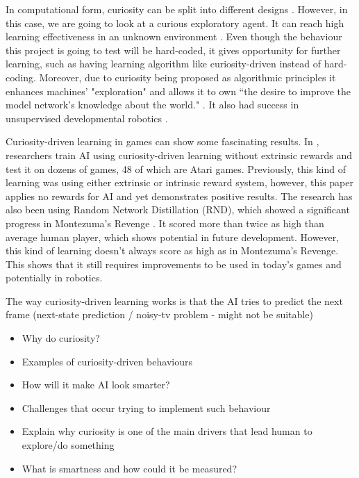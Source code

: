 \documentclass[journal]{IEEEtran}
\begin{document}
In computational form, curiosity can be split into different designs \cite{wu2013curiosity}. However, in this case, we are going to look at a curious exploratory agent. It can reach high learning effectiveness in an unknown environment \cite{wu2013curiosity}\cite{macedo2005role}. Even though the behaviour this project is going to test will be hard-coded, it gives opportunity for further learning, such as having learning algorithm like curiosity-driven instead of hard-coding. Moreover, due to curiosity being proposed as algorithmic principles \cite{wu2013curiosity}\cite{pang2009curiosity}\cite{karaoguz2011curiosity} it enhances machines' "exploration" and allows it to own ``the desire to improve the model network's knowledge about the world." \cite{schmidhuber1991possibility}. It also had success in unsupervised developmental robotics \cite{schmidhuber2006developmental}\cite{oudeyer2004intelligent}.

Curiosity-driven learning in games can show some fascinating results. In \cite{burda2018large}, researchers train AI using curiosity-driven learning without extrinsic rewards and test it on dozens of games, 48 of which are Atari games. Previously, this kind of learning was using either extrinsic or intrinsic reward system, however, this paper applies no rewards for AI and yet demonstrates positive results. The research has also been using Random Network Distillation (RND), which showed a significant progress in Montezuma's Revenge \cite{openairl}\cite{montezumarevenge}. It scored more than twice as high than average human player, which shows potential in future development. However, this kind of learning doesn't always score as high as in Montezuma's Revenge. This shows that it still requires improvements to be used in today's games and potentially in robotics.

The way curiosity-driven learning works is that the AI tries to predict the next frame (next-state prediction / noisy-tv problem - might not be suitable)
\begin{itemize}
	\item Why do curiosity?
	\item Examples of curiosity-driven behaviours
	\item How will it make AI look smarter?
	\item Challenges that occur trying to implement such behaviour
	\item Explain why curiosity is one of the main drivers that lead human to explore/do something
	\item What is smartness and how could it be measured?
\end{itemize}
\end{document}
